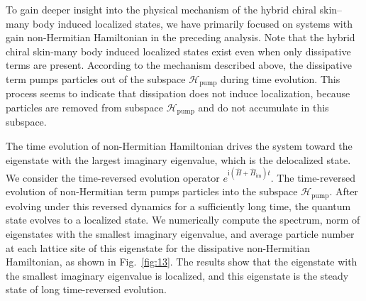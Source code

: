 \documentclass[longbibliography, aps, prx, amsmath, amssymb, amsfonts, twocolumn,superscriptaddress, footinbib]{revtex4-1}
\begin{document}
	
	To gain deeper insight into the physical mechanism of the hybrid chiral skin–many body induced localized states, we have primarily focused on systems with gain non-Hermitian Hamiltonian in the preceding analysis. 
	Note that the hybrid chiral skin-many body induced localized states exist even when only dissipative terms are present.
	According to the mechanism described above, the dissipative term pumps particles out of the subspace $\mathscr{H}_{\text{pump}}$ during time evolution.
	This process seems to indicate that dissipation does not induce localization, because particles are removed from subspace $\mathscr{H}_{\text{pump}}$ and do not accumulate in this subspace.

	The time evolution of non-Hermitian Hamiltonian drives the system toward the eigenstate with the largest imaginary eigenvalue, which is the delocalized state.
	We consider the time-reversed evolution operator $e^{\mathrm{i}(\hat{H} + \hat{H}_{\text{im}})t}$. The time-reversed evolution of non-Hermitian term pumps particles into the subspace $\mathscr{H}_{\text{pump}}$. After evolving under this reversed dynamics for a sufficiently long time, the quantum state evolves to a localized state.
	We numerically compute the spectrum, norm of eigenstates with the smallest imaginary eigenvalue, and average particle number at each lattice site of this eigenstate for the dissipative non-Hermitian Hamiltonian, as shown in Fig.~\ref{fig:13}. The results show that the eigenstate with the smallest imaginary eigenvalue is localized, and this eigenstate is the steady state of long time-reversed evolution.

\end{document}
